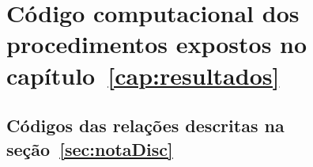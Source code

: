 \chapter{Código computacional dos procedimentos expostos no capítulo~\ref{cap:resultados}}
\label{cap:codigoProc}

\section{Códigos das relações descritas na seção~\ref{sec:notaDisc}}\label{sec:cod1}

